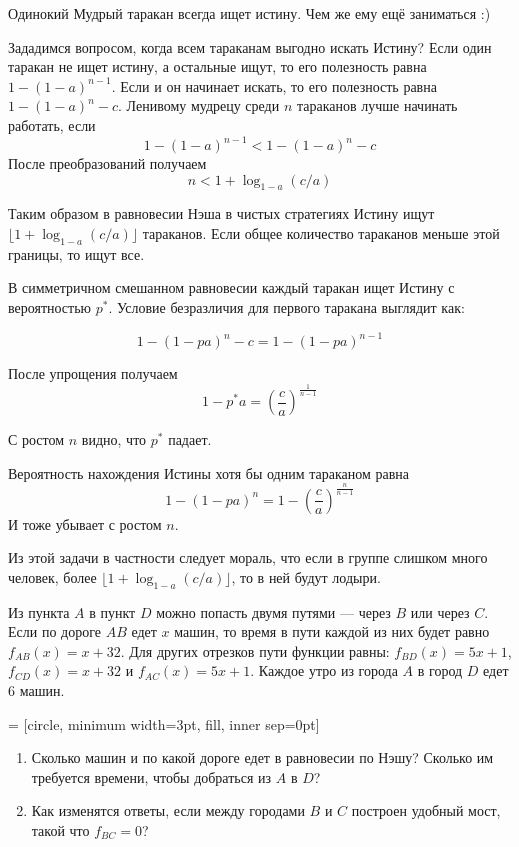 \begin{solution}
Одинокий Мудрый таракан всегда ищет истину. Чем же ему ещё заниматься :)

Зададимся вопросом, когда всем тараканам выгодно искать Истину?
Если один таракан не ищет истину, а остальные ищут, то его полезность равна $1-(1-a)^{n-1}$. Если и он начинает искать, то его полезность равна $1-(1-a)^n-c$. Ленивому мудрецу среди $n$ тараканов лучше начинать работать, если 
\[
1-(1-a)^{n-1} < 1-(1-a)^n-c
\]
После преобразований получаем
\[
n< 1 + \log_{1-a}(c/a)
\]

Таким образом в равновесии Нэша в чистых стратегиях Истину ищут $\lfloor 1 + \log_{1-a}(c/a) \rfloor$ тараканов. Если общее количество тараканов меньше этой границы, то ищут все.

В симметричном смешанном равновесии каждый таракан ищет Истину с вероятностью $p^*$.  Условие безразличия для первого таракана выглядит как:

\[
1-(1-pa)^n-c=1-(1-pa)^{n-1}
\]

После упрощения получаем
\[
1-p^{*}a=\left(\frac{c}{a}\right)^{\frac{1}{n-1}}
\]

С ростом $n$ видно, что $p^*$ падает.

Вероятность нахождения Истины хотя бы одним тараканом равна
\[
1-(1-pa)^n=1-\left(\frac{c}{a}\right)^{\frac{n}{n-1}}
\]
И тоже убывает с ростом $n$.

Из этой задачи в частности следует мораль, что если в группе слишком много человек, более $\lfloor 1 + \log_{1-a}(c/a) \rfloor$, то в ней будут лодыри.

\end{solution}

\begin{problem}
Из пункта $A$ в пункт $D$ можно попасть двумя путями --- через $B$ или
через $C$. Если по дороге $AB$ едет $x$ машин, то время в пути каждой
из них будет равно $f_{AB}(x)=x+32$. Для других отрезков пути
функции равны: $f_{BD}(x)=5x+1$, $f_{CD}(x)=x+32$ и
$f_{AC}(x)=5x+1$.
Каждое утро из города $A$ в город $D$ едет 6 машин. 

 = [circle, minimum width=3pt, fill, inner sep=0pt]



\begin{enumerate}
\item Сколько машин и по какой дороге едет в равновесии по Нэшу?
Сколько им требуется времени, чтобы добраться из $A$ в $D$? 
\item  Как изменятся ответы, если между городами $B$ и $C$ построен удобный мост, такой что $f_{BC}=0$? 
\end{enumerate}
\end{problem}

